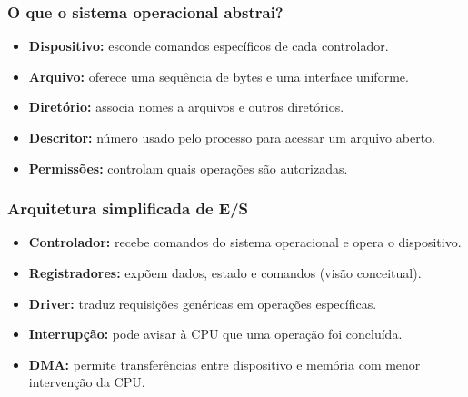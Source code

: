 \documentclass[aspectratio=169,11pt]{beamer}
\begin{document}
\begin{frame}
\frametitle{O que o sistema operacional abstrai?}
\large
\begin{itemize}
\item \textbf{Dispositivo:} esconde comandos específicos de cada controlador.
\item \textbf{Arquivo:} oferece uma sequência de bytes e uma interface uniforme.
\item \textbf{Diretório:} associa nomes a arquivos e outros diretórios.
\item \textbf{Descritor:} número usado pelo processo para acessar um arquivo aberto.
\item \textbf{Permissões:} controlam quais operações são autorizadas.
\end{itemize}

\end{frame}

\begin{frame}
\frametitle{Arquitetura simplificada de E/S}
\large
\begin{itemize}
\item \textbf{Controlador:} recebe comandos do sistema operacional e opera o dispositivo.
\item \textbf{Registradores:} expõem dados, estado e comandos (visão conceitual).
\item \textbf{Driver:} traduz requisições genéricas em operações específicas.
\item \textbf{Interrupção:} pode avisar à CPU que uma operação foi concluída.
\item \textbf{DMA:} permite transferências entre dispositivo e memória com menor intervenção da CPU.
\end{itemize}

\end{frame}
\end{document}

